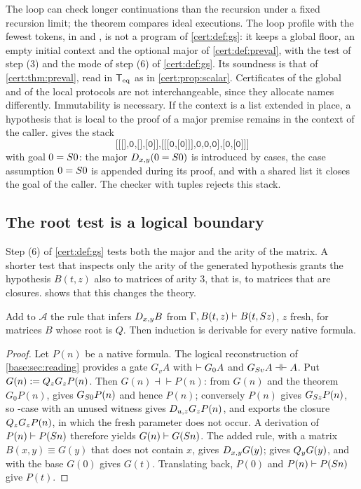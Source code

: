 The loop can check longer continuations than the recursion under a fixed
recursion limit; the theorem compares ideal executions. The loop profile with
the fewest tokens, in  and , is
not a program of \cref{cert:def:gs}: it keeps a global floor, an empty initial
context and the optional major of \cref{cert:def:preval}, with the test of
step (3) and the mode of step (6) of \cref{cert:def:gs}. Its soundness is that
of \cref{cert:thm:preval}, read in $\mathsf{T}_{\mathrm{eq}}$ as in \cref{cert:prop:scalar}.
Certificates of the global and of the local protocols are not interchangeable,
since they allocate names differently. Immutability is
necessary. If the context is a list extended in place, a hypothesis that is
local to the proof of a major premise remains in the context of the caller.
 gives the stack
\[
\texttt{[[[],0,[],[0]],[[[0,[0]]],0,0,0],[0,[0]]]}
\]
with goal $0=S 0$: the major $D_{x,y}(0=S 0)$ is introduced by cases,
the case assumption $0=S 0$ is appended during its proof, and with a shared
list it closes the goal of the caller. The checker with tuples rejects this
stack.

\subsection{The root test is a logical boundary}

Step (6) of \cref{cert:def:gs} tests both the major and the arity of the
matrix. A shorter test that inspects only the arity of the generated
hypothesis grants the hypothesis $B(t,z)$ also to matrices of arity $3$, that
is, to matrices that are closures.  shows that this
changes the theory.

\begin{proposition}\label{cert:prop:closure-progress}
Add to $\mathcal A$ the rule that infers $D_{x,y}B$ from
$\Gamma,B(t,z)\vdash B(t,S z)$, $z$ fresh, for matrices $B$ whose root is
$Q$. Then induction is derivable for every native formula.
\end{proposition}
\begin{proof}
Let $P(n)$ be a native formula. The logical reconstruction of
\cref{base:sec:reading} provides a gate $G_vA$ with $\vdash G_0A$ and
$G_{S v}A\dashv\vdash A$. Put $G(n)\mathrel{:=}Q_{z}G_zP(n)$. Then
$G(n)\dashv\vdash P(n)$: from $G(n)$ and the theorem $G_0P(n)$, 
gives $G_{S 0}P(n)$ and hence $P(n)$; conversely $P(n)$ gives
$G_{S z}P(n)$, so -case with an unused witness gives
$D_{u,z}G_zP(n)$, and  exports the closure $Q_{z}G_zP(n)$, in
which the fresh parameter does not occur.
A derivation of
$P(n)\vdash P(S n)$ therefore yields $G(n)\vdash G(S n)$. The added
rule, with a matrix $B(x,y)\equiv G(y)$ that does not contain $x$, gives
$D_{x,y}G(y)$;  gives $Q_{y}G(y)$, and  with the
base $G(0)$ gives $G(t)$. Translating back, $P(0)$ and $P(n)\vdash P(S n)$
give $P(t)$.
\end{proof}

